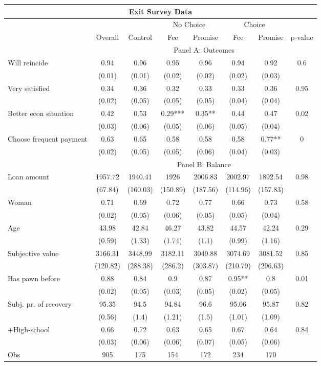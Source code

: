 \begin{tabular}{lccccccc}
\toprule
\multicolumn{8}{c}{Exit Survey Data} \\
\midrule
\midrule
      &       &       & \multicolumn{2}{c}{No Choice } & \multicolumn{2}{c}{Choice} &  \\
\midrule
\midrule
      & Overall & Control & Fee   & Promise & Fee   & Promise & p-value \\
\midrule
      & \multicolumn{7}{c}{Panel A: Outcomes} \\
\midrule
\midrule
Will reincide & 0.94  & 0.96  & 0.95  & 0.96  & 0.94  & 0.92  & 0.6 \\
      & (0.01) & (0.01) & (0.02) & (0.02) & (0.02) & (0.03) &  \\
Very satisfied & 0.34  & 0.36  & 0.32  & 0.33  & 0.33  & 0.36  & 0.95 \\
      & (0.02) & (0.05) & (0.05) & (0.05) & (0.04) & (0.04) &  \\
Better econ situation & 0.42  & 0.53  & 0.29*** & 0.35** & 0.44  & 0.47  & 0.02 \\
      & (0.03) & (0.06) & (0.05) & (0.06) & (0.05) & (0.04) &  \\
Choose frequent payment & 0.63  & 0.65  & 0.58  & 0.58  & 0.58  & 0.77** & 0 \\
      & (0.02) & (0.05) & (0.05) & (0.06) & (0.04) & (0.03) &  \\
\midrule
      & \multicolumn{7}{c}{Panel B: Balance} \\
\midrule
\midrule
Loan amount  & 1957.72 & 1940.41 & 1926  & 2006.83 & 2002.97 & 1892.54 & 0.98 \\
      & (67.84) & (160.03) & (150.89) & (187.56) & (114.96) & (157.83) &  \\
Woman & 0.71  & 0.69  & 0.72  & 0.77  & 0.66  & 0.73  & 0.58 \\
      & (0.02) & (0.05) & (0.06) & (0.05) & (0.05) & (0.04) &  \\
Age   & 43.98 & 42.84 & 46.27 & 43.82 & 44.57 & 42.24 & 0.29 \\
      & (0.59) & (1.33) & (1.74) & (1.1) & (0.99) & (1.16) &  \\
Subjective value & 3166.31 & 3448.99 & 3182.11 & 3049.88 & 3074.69 & 3081.52 & 0.85 \\
      & (120.82) & (288.38) & (286.2) & (303.87) & (210.79) & (296.63) &  \\
Has pawn before & 0.88  & 0.84  & 0.9   & 0.87  & 0.95** & 0.8   & 0.01 \\
      & (0.02) & (0.05) & (0.03) & (0.05) & (0.02) & (0.05) &  \\
Subj. pr. of recovery & 95.35 & 94.5  & 94.84 & 96.6  & 95.06 & 95.87 & 0.82 \\
      & (0.56) & (1.4) & (1.21) & (1.5) & (1.01) & (1.09) &  \\
+High-school & 0.66  & 0.72  & 0.63  & 0.65  & 0.67  & 0.64  & 0.84 \\
      & (0.03) & (0.06) & (0.06) & (0.07) & (0.05) & (0.06) &  \\
\midrule
Obs   & 905   & 175   & 154   & 172   & 234   & 170   &  \\
\bottomrule
\bottomrule
\end{tabular}%

